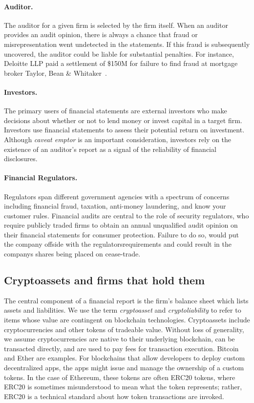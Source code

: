 \paragraph{Auditor.} The auditor for a given firm is selected by the firm itself. When an auditor provides an audit opinion, there is always a chance that fraud or misrepresentation went undetected in the statements. If this fraud is subsequently uncovered, the auditor could be liable for substantial penalties. For instance, Deloitte LLP paid a settlement of \$150M for failure to find fraud at mortgage broker Taylor, Bean \& Whitaker~\cite{FTDeloitte2018}.


\paragraph{Investors.} The primary users of financial statements are external investors who make decisions about whether or not to lend money or invest capital in a target firm. Investors use financial statements to assess their potential return on investment. Although \textit{caveat emptor} is an important consideration, investors rely on the existence of an auditor's report as a signal of the reliability of financial disclosures.
 
\paragraph{Financial Regulators.} Regulators span different government agencies with a spectrum of concerns including financial fraud, taxation, anti-money laundering, and know your customer rules. Financial audits are central to the role of security regulators, who require publicly traded firms to obtain an annual unqualified audit opinion on their financial statements for consumer protection. Failure to do so, would put the company offside with the regulators\textquotesingle  requirements and could result in the company\textquotesingle s shares being placed on cease-trade. 


\subsection{Cryptoassets and firms that hold them}
The central component of a financial report is the firm’s balance sheet which lists assets and liabilities. We use the term \textit{cryptoasset} and \textit{cryptoliability} to refer to items whose value are contingent on blockchain technologies. Cryptoassets include cryptocurrencies and other tokens of tradeable value. Without loss of generality, we assume cryptocurrencies are native to their underlying blockchain, can be transacted directly, and are used to pay fees for transaction execution. Bitcoin and Ether are examples. For blockchains that allow developers to deploy custom decentralized apps, the apps might issue and manage the ownership of a custom tokens. In the case of Ethereum, these tokens are often ERC20 tokens, where ERC20 is sometimes misunderstood to mean what the token represents; rather, ERC20 is a technical standard about how token transactions are invoked.	

